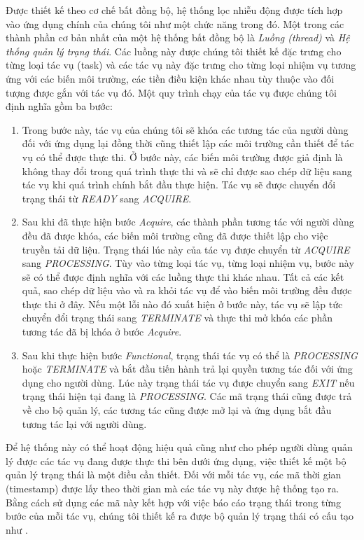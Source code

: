 		Được thiết kế theo cơ chế bất đồng bộ, hệ thống lọc nhiễu động được tích hợp vào ứng dụng chính của chúng tôi như một chức năng trong đó. Một trong các thành phần cơ bản nhất của một hệ thống bất đồng bộ là \textit{Luồng (thread)} và \textit{Hệ thống quản lý trạng thái}. Các luồng này được chúng tôi thiết kế đặc trưng cho từng loại tác vụ (task) và các tác vụ này đặc trưng cho từng loại nhiệm vụ tương ứng với các biến môi trường, các tiền điều kiện khác nhau tùy thuộc vào đối tượng được gắn với tác vụ đó. Một quy trình chạy của tác vụ được chúng tôi định nghĩa gồm ba bước:
		
			\begin{enumerate}[1.]
				\item {} Trong bước này, tác vụ của chúng tôi sẽ khóa các tương tác của người dùng đối với ứng dụng lại đồng thời cũng thiết lập các môi trường cần thiết để tác vụ có thể được thực thi. Ở bước này, các biến môi trường được giả định là không thay đổi trong quá trình thực thi và sẽ chỉ được sao chép dữ liệu sang tác vụ khi quá trình chính bắt đầu thực hiện. Tác vụ sẽ được chuyển đổi trạng thái từ \textit{READY} sang \textit{ACQUIRE}.
				\item {} Sau khi đã thực hiện bước \textit{Acquire}, các thành phần tương tác với người dùng đều đã được khóa, các biến môi trường cũng đã được thiết lập cho việc truyền tải dữ liệu. Trạng thái lúc này của tác vụ được chuyển từ \textit{ACQUIRE} sang \textit{PROCESSING}. Tùy vào từng loại tác vụ, từng loại nhiệm vụ, bước này sẽ có thể được định nghĩa với các luồng thực thi khác nhau. Tất cả các kết quả, sao chép dữ liệu vào và ra khỏi tác vụ để vào biến môi trường đều được thực thi ở đây. Nếu một lỗi nào đó xuất hiện ở bước này, tác vụ sẽ lập tức chuyển đổi trạng thái sang \textit{TERMINATE} và thực thi mở khóa các phần tương tác đã bị khóa ở bước \textit{Acquire}.
				\item {} Sau khi thực hiện bước \textit{Functional}, trạng thái tác vụ có thể là \textit{PROCESSING} hoặc \textit{TERMINATE} và bắt đầu tiến hành trả lại quyền tương tác đối với ứng dụng cho người dùng. Lúc này trạng thái tác vụ được chuyển sang \textit{EXIT} nếu trạng thái hiện tại đang là \textit{PROCESSING}. Các mã trạng thái cũng được trả về cho bộ quản lý, các tương tác cũng được mở lại và ứng dụng bắt đầu tương tác lại với người dùng.
			\end{enumerate}
		
		Để hệ thống này có thể hoạt động hiệu quả cũng như cho phép người dùng quản lý được các tác vụ đang được thực thi bên dưới ứng dụng, việc thiết kế một bộ quản lý trạng thái là một điều cần thiết. Đối với mỗi tác vụ, các mã thời gian (timestamp) được lấy theo thời gian mà các tác vụ này được hệ thống tạo ra. Bằng cách sử dụng các mã này kết hợp với việc báo cáo trạng thái trong từng bước của mỗi tác vụ, chúng tôi thiết kế ra được bộ quản lý trạng thái có cấu tạo như .
		
